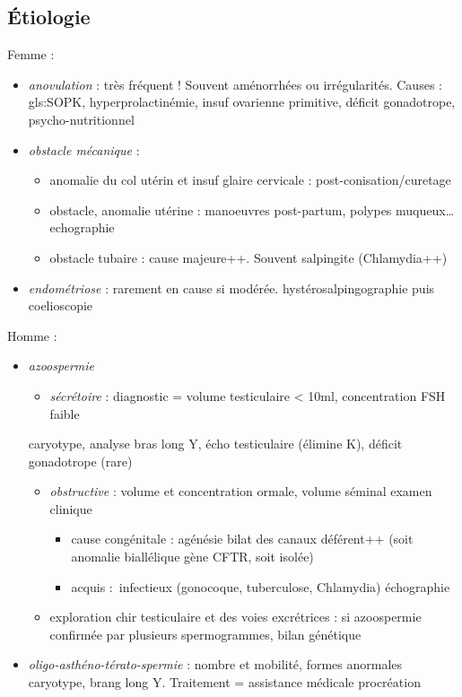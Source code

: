 \documentclass{book}
\begin{document}
\subsection{Étiologie}
\label{sec:org715df0e}
Femme :
\begin{itemize}
\item \emph{anovulation} : très fréquent ! Souvent aménorrhées ou irrégularités. Causes :
gls:SOPK, hyperprolactinémie, insuf ovarienne primitive, déficit gonadotrope, psycho-nutritionnel
\item \emph{obstacle mécanique} :
\begin{itemize}
\item anomalie du col utérin et insuf glaire cervicale : post-conisation/curetage
\item obstacle, anomalie utérine : manoeuvres post-partum, polypes muqueux\ldots{} \thus
echographie
\item obstacle tubaire : cause majeure++. Souvent salpingite (Chlamydia++)
\end{itemize}
\item \emph{endométriose} : rarement en cause si modérée. hystérosalpingographie puis coelioscopie
\end{itemize}
Homme :
\begin{itemize}
\item \emph{azoospermie}
\begin{itemize}
\item \emph{sécrétoire} : diagnostic = volume testiculaire < 10ml, concentration FSH
faible
\end{itemize}
\thus caryotype, analyse bras long Y, écho testiculaire (élimine K), déficit gonadotrope (rare)
\begin{itemize}
\item \emph{obstructive} : volume et concentration ormale, volume séminal \dec \thus
examen clinique
\begin{itemize}
\item cause congénitale : agénésie bilat des canaux déférent++ (soit anomalie
biallélique gène CFTR, soit isolée)
\item acquis : infectieux  (gonocoque, tuberculose, Chlamydia) \thus échographie
\end{itemize}
\item exploration chir testiculaire et des voies excrétrices : si azoospermie
confirmée par plusieurs spermogrammes, bilan génétique
\end{itemize}
\item \emph{oligo-asthéno-térato-spermie} : \dec nombre et mobilité, \inc formes anormales
\thus caryotype, brang long Y. Traitement = assistance médicale procréation
\end{itemize}
\end{document}
